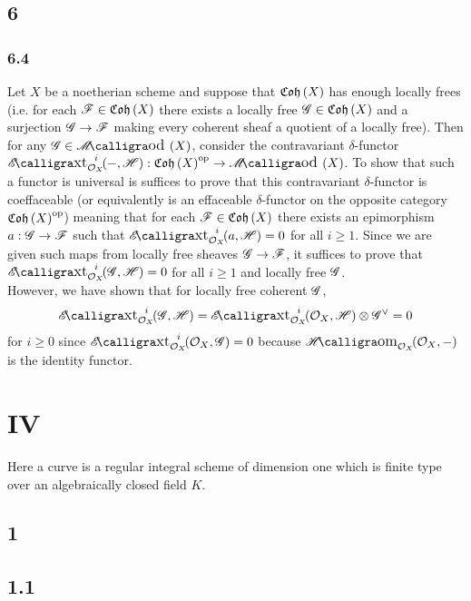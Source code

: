 \documentclass[12pt]{article}
\begin{document}
\subsection{6}

\subsubsection{6.4}

Let $X$ be a noetherian scheme and suppose that $\mathfrak{Coh}\left(X\right)$ has enough locally frees (i.e. for each $\mathscr{F} \in \mathfrak{Coh}\left(X\right)$ there exists a locally free $\mathscr{G} \in \mathfrak{Coh}\left(X\right)$ and a surjection $\mathscr{G} \to \mathscr{F}$ making every coherent sheaf a quotient of a locally free). Then for any $\G \in \shMod{X}$, consider the contravariant $\delta$-functor $\shExt{i}{\struct{X}}{-}{\H} : \Coh{X}^{\op} \to \shMod{X}$. To show that such a functor is universal is suffices to prove that this contravariant $\delta$-functor is coeffaceable (or equivalently is an effaceable $\delta$-functor on the opposite category $\mathfrak{Coh}\left(X\right)^{\mathrm{op}}$) meaning that for each $\mathscr{F} \in \mathfrak{Coh}\left(X\right)$ there exists an epimorphism $a : \mathscr{G} \to \mathscr{F}$ such that $\shExt{i}{\struct{X}}{a}{\H} = 0$ for all $i \ge 1$. Since we are given such maps from locally free sheaves $\mathscr{G} \to \mathscr{F}$, it suffices to prove that $\shExt{i}{\struct{X}}{\G}{\H} = 0$ for all $i \ge 1$ and locally free $\mathscr{G}$. 
\bigskip\\
However, we have shown that for locally free coherent $\mathscr{G}$,
\[ \shExt{i}{\struct{X}}{\G}{\H} = \shExt{i}{\struct{X}}{\struct{X}}{\H} \otimes \G^\vee = 0 \]
for $i \ge 0$ since $\shExt{i}{\struct{X}}{\struct{X}}{\G} = 0$ because $\shHomover{\struct{X}}{\struct{X}}{-}$ is the identity functor. 

\section{IV}

\begin{definition}
Here a curve is a regular integral scheme of dimension one which is finite type over an algebraically closed field $K$.
\end{definition}

\subsection{1}

\subsection{1.1}
\end{document}
